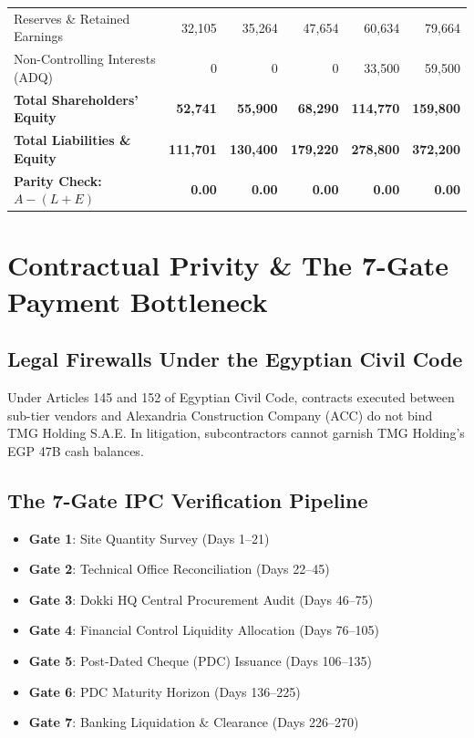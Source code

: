 \documentclass[11pt,a4paper]{report}
\begin{document}
\begin{table}[h]
\begin{tabular}{lrrrrr}
Reserves \& Retained Earnings & 32,105 & 35,264 & 47,654 & 60,634 & 79,664 \\
Non-Controlling Interests (ADQ) & 0 & 0 & 0 & 33,500 & 59,500 \\
\midrule
\textbf{Total Shareholders' Equity} & \textbf{52,741} & \textbf{55,900} & \textbf{68,290} & \textbf{114,770} & \textbf{159,800} \\
\midrule
\textbf{Total Liabilities \& Equity} & \textbf{111,701} & \textbf{130,400} & \textbf{179,220} & \textbf{278,800} & \textbf{372,200} \\
\textbf{Parity Check: $A - (L+E)$} & \textbf{0.00} & \textbf{0.00} & \textbf{0.00} & \textbf{0.00} & \textbf{0.00} \\
\bottomrule
\end{tabular}
\end{table}

\chapter{Contractual Privity \& The 7-Gate Payment Bottleneck}
\section{Legal Firewalls Under the Egyptian Civil Code}
Under Articles 145 and 152 of Egyptian Civil Code, contracts executed between sub-tier vendors and Alexandria Construction Company (ACC) do not bind TMG Holding S.A.E. In litigation, subcontractors cannot garnish TMG Holding's EGP 47B cash balances.

\section{The 7-Gate IPC Verification Pipeline}
\begin{itemize}
    \item \textbf{Gate 1}: Site Quantity Survey (Days 1--21)
    \item \textbf{Gate 2}: Technical Office Reconciliation (Days 22--45)
    \item \textbf{Gate 3}: Dokki HQ Central Procurement Audit (Days 46--75)
    \item \textbf{Gate 4}: Financial Control Liquidity Allocation (Days 76--105)
    \item \textbf{Gate 5}: Post-Dated Cheque (PDC) Issuance (Days 106--135)
    \item \textbf{Gate 6}: PDC Maturity Horizon (Days 136--225)
    \item \textbf{Gate 7}: Banking Liquidation \& Clearance (Days 226--270)
\end{itemize}
\end{document}
